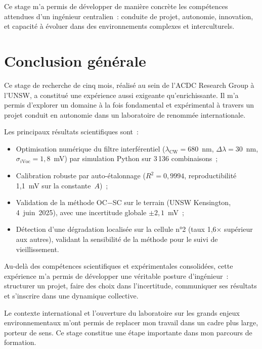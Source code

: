 \documentclass[12pt,a4paper]{report}
\begin{document}
Ce stage m'a permis de développer de manière concrète les compétences attendues d'un ingénieur centralien~: conduite de projet, autonomie, innovation, et capacité à évoluer dans des environnements complexes et interculturels.

\chapter*{Conclusion générale}

Ce stage de recherche de cinq mois, réalisé au sein de l'ACDC Research Group à l'UNSW, a constitué une expérience aussi exigeante qu'enrichissante. Il m'a permis d'explorer un domaine à la fois fondamental et expérimental à travers un projet conduit en autonomie dans un laboratoire de renommée internationale.

Les principaux résultats scientifiques sont~:
\begin{itemize}
  \item Optimisation numérique du filtre interférentiel ($\lambda_\text{CW} = 680$~nm, $\Delta\lambda = 30$~nm, $\sigma_{i\text{Voc}} = 1{,}8$~mV) par simulation Python sur 3\,136 combinaisons~;
  \item Calibration robuste par auto-étalonnage ($R^2 = 0{,}9994$, reproductibilité 1,1~mV sur la constante~$A$)~;
  \item Validation de la méthode OC$-$SC sur le terrain (UNSW Kensington, 4~juin~2025), avec une incertitude globale $\pm 2{,}1$~mV~;
  \item Détection d'une dégradation localisée sur la cellule n°2 (taux 1,6$\times$ supérieur aux autres), validant la sensibilité de la méthode pour le suivi de vieillissement.
\end{itemize}

Au-delà des compétences scientifiques et expérimentales consolidées, cette expérience m'a permis de développer une véritable posture d'ingénieur~: structurer un projet, faire des choix dans l'incertitude, communiquer ses résultats et s'inscrire dans une dynamique collective.

Le contexte international et l'ouverture du laboratoire sur les grands enjeux environnementaux m'ont permis de replacer mon travail dans un cadre plus large, porteur de sens. Ce stage constitue une étape importante dans mon parcours de formation.

\printbibliography[heading=bibintoc,title={Bibliographie}]
\end{document}
